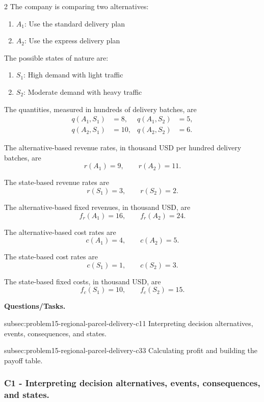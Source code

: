 \begin{multicols}{2}
	The company is comparing two alternatives:
	\begin{enumerate}[label=\arabic*.]
		\item \(A_1\): Use the standard delivery plan
		\item \(A_2\): Use the express delivery plan
	\end{enumerate}
	
	The possible states of nature are:
	\begin{enumerate}[label=\arabic*.]
		\item \(S_1\): High demand with light traffic
		\item \(S_2\): Moderate demand with heavy traffic
	\end{enumerate}
	
	\columnbreak
	
	The quantities, measured in hundreds of delivery batches, are
	\[
	\begin{aligned}
		q(A_1,S_1)&=8,
		&
		q(A_1,S_2)&=5,
		\\
		q(A_2,S_1)&=10,
		&
		q(A_2,S_2)&=6.
	\end{aligned}
	\]
	
	The alternative-based revenue rates, in thousand USD per hundred
	delivery batches, are
	\[
	r(A_1)=9,
	\qquad
	r(A_2)=11.
	\]
	
	The state-based revenue rates are
	\[
	r(S_1)=3,
	\qquad
	r(S_2)=2.
	\]
	
	The alternative-based fixed revenues, in thousand USD, are
	\[
	f_r(A_1)=16,
	\qquad
	f_r(A_2)=24.
	\]
	
	The alternative-based cost rates are
	\[
	c(A_1)=4,
	\qquad
	c(A_2)=5.
	\]
	
	The state-based cost rates are
	\[
	c(S_1)=1,
	\qquad
	c(S_2)=3.
	\]
	
	The state-based fixed costs, in thousand USD, are
	\[
	f_c(S_1)=10,
	\qquad
	f_c(S_2)=15.
	\]
\end{multicols}

\textbf{Questions/Tasks.}
\begin{enumerate}
	\CriterionTask
	{subsec:problem15-regional-parcel-delivery-c1}{1}
	{Interpreting decision alternatives, events, consequences, and states.}

	\CriterionTask
	{subsec:problem15-regional-parcel-delivery-c3}{3}
	{Calculating profit and building the payoff table.}
\end{enumerate}

\subsubsection*{C1 - Interpreting decision alternatives, events, consequences, and states.}
\label{subsec:problem15-regional-parcel-delivery-c1}

